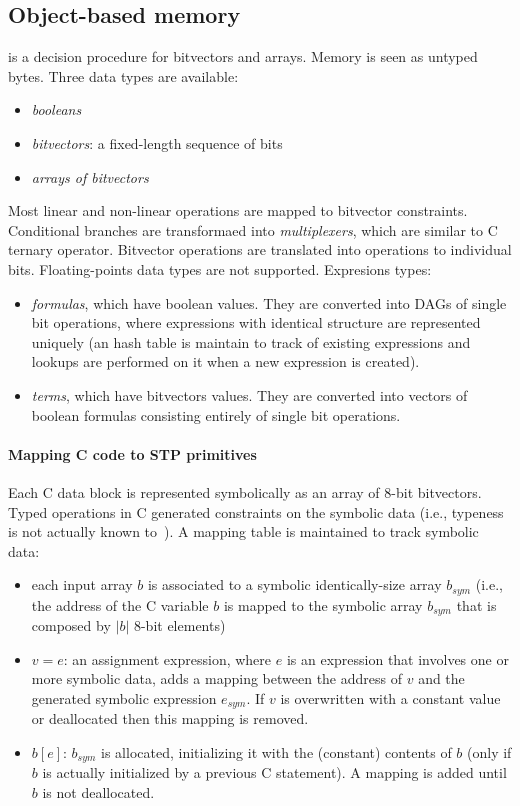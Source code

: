 \subsection{Object-based memory}

\cite{STP-TR07} is a decision procedure for bitvectors and arrays. Memory is seen as untyped bytes. Three data types are available:
\begin{itemize}
  \item {\em booleans}
  \item {\em bitvectors}: a fixed-length sequence of bits
  \item {\em arrays of bitvectors}
\end{itemize}
Most linear and non-linear operations are mapped to bitvector constraints. Conditional branches are transformaed into {\em multiplexers}, which are similar to C ternary operator. Bitvector operations are translated into operations to individual bits. Floating-points data types are not supported. Expresions types:
\begin{itemize}
  \item {\em formulas}, which have boolean values. They are converted into DAGs of single bit operations, where expressions with identical structure are represented uniquely (an hash table is maintain to track of existing expressions and lookups are performed on it when a new expression is created).
  \item {\em terms}, which have bitvectors values. They are converted into vectors of boolean formulas consisting entirely of single bit operations.
\end{itemize}

\paragraph{Mapping C code to STP primitives} Each C data block is represented symbolically as an array of 8-bit bitvectors. Typed operations in C generated constraints on the symbolic data (i.e., typeness is not actually known to~\cite{STP-TR07}). A mapping table is maintained to track symbolic data:
\begin{itemize}
  \item each input array $b$ is associated to a symbolic identically-size array $b_{sym}$ (i.e., the address of the C variable $b$ is mapped to the symbolic array $b_{sym}$ that is composed by $|b|$ 8-bit elements)
  \item $v = e$: an assignment expression, where $e$ is an expression that involves one or more symbolic data, adds a mapping between the address of $v$ and the generated symbolic expression $e_{sym}$. If $v$ is overwritten with a constant value or deallocated then this mapping is removed.
  \item $b[e]$: $b_{sym}$ is allocated, initializing it with the (constant) contents of $b$ (only if $b$ is actually initialized by a previous C statement). A mapping is added until $b$ is not deallocated.
\end{itemize}

